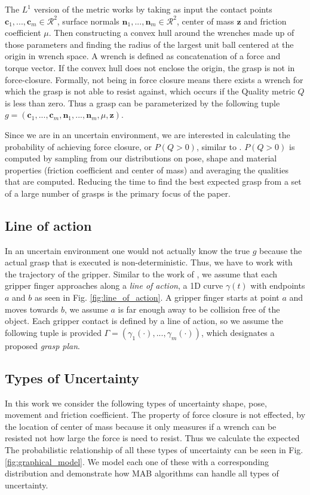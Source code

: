 \documentclass[letterpaper, 10 pt, conference]{ieeeconf}  %
\begin{document}
The $L^1$ version of the metric works by taking as input the contact points $\textbf{c}_1,...,\textbf{c}_m \in \mathcal{R}^2$, surface normals $\textbf{n}_1,...,\textbf{n}_m \in \mathcal{R}^2$, center of mass $\textbf{z}$ and friction coefficient $\mu$. Then constructing a convex hull around the wrenches made up of those parameters and finding the radius of the largest unit ball centered at the origin in wrench space. A wrench is defined as concatenation of a force and torque vector.  If the convex hull does not enclose the origin, the grasp is not in force-closure. Formally, not being in force closure means there exists a wrench for which the grasp is not able to resist against, which occurs if the Quality metric $Q$ is less than zero. Thus a grasp can be parameterized by the following tuple $g = ( \textbf{c}_1,...,\textbf{c}_m,\textbf{n}_1,...,\textbf{n}_m,\mu, \textbf{z} )$.

Since we are in an uncertain environment, we are interested in calculating the probability of achieving force closure, or $P(Q>0)$, similar to  \cite{christopoulos2007handling}\cite{kehoe2012toward} . $P(Q>0)$ is computed by sampling from our distributions on pose, shape and material properties (friction coefficient and center of mass) and averaging the qualities that are computed. Reducing the time to find the best expected grasp from a set of a large number of grasps is the primary focus of the paper. 

\subsection{Line of action}
In an uncertain environment one would not actually know the true $g$ because the actual grasp that is executed is non-deterministic. Thus, we have to work with the trajectory of the gripper. Similar to the work of \cite{christopoulos2007handling}, we assume that each gripper finger approaches along a \textit{line of action}, a 1D curve $\gamma(t)$ with endpoints $a$ and $b$ as seen in Fig. \ref{fig:line_of_action}.
A gripper finger starts at point $a$ and moves towards $b$, we assume $a$ is far enough away to be collision free of the object.
Each gripper contact is defined by a line of action, so we assume the following tuple is provided $\Gamma = ( \gamma_1(\cdot),...,\gamma_m(\cdot) )$, which designates a proposed \textit{grasp plan}.

\subsection{Types of Uncertainty}
In this work we consider the following types of uncertainty shape, pose, movement  and friction coefficient.  The property of force closure is not effected, by the location of center of mass because it only measures if a wrench can be resisted not how large the force is need to resist. Thus we calculate the expected The probabilistic relationship of all these types of uncertainty can be seen in Fig. \ref{fig:graphical_model}. We model each one of these with a corresponding distribution and demonstrate how MAB algorithms can handle all types of uncertainty.
\end{document}
